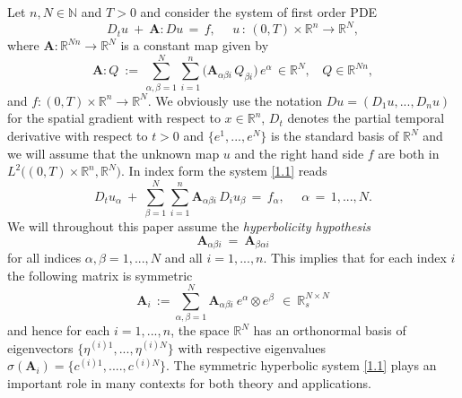 \documentclass{amsart}
\theoremstyle{definition}
\numberwithin{equation}{section}
\begin{document}
Let $n,N\in {\mathbb{N}}$ and $T>0$ and consider the system of first order PDE
\begin{equation} \label{1.1}
D_t u\ +\ {\textbf{A}} {\!:\!} D u\, =\, f,\ \ \ \ \ \ u\,:\, (0,T){\times}{\mathbb{R}}^n{\longrightarrow} {\mathbb{R}}^N,
\end{equation}
where ${\textbf{A}} : {\mathbb{R}}^{Nn}{\longrightarrow} {\mathbb{R}}^N$ is  a constant map given by
\begin{equation} \label{1.2}
 {\textbf{A}} {\!:\!} Q\ :=\, \sum_{{\alpha},{\beta}=1}^N\sum_{i=1}^n\big({\textbf{A}}_{{\alpha}{\beta} i}\,Q_{{\beta} i}\big)\, e^{\alpha} \, \in {\mathbb{R}}^N, \ \ \ \ Q\in {\mathbb{R}}^{Nn},
\end{equation}
and $f : (0,T){\times}{\mathbb{R}}^n{\longrightarrow} {\mathbb{R}}^N$. We obviously use the notation $Du=(D_1u,...,D_nu)$ for the spatial gradient with respect to $x\in {\mathbb{R}}^n$, $D_t$ denotes the partial temporal derivative with respect to $t>0$ and $\{e^1,...,e^N\}$ is the standard basis of ${\mathbb{R}}^N$ and we will assume that the unknown map $u$ and the right hand side $f$ are both in $L^2\big((0,T)\!{\times}{\mathbb{R}}^n,{\mathbb{R}}^N \big)$.  In index form the system \eqref{1.1} reads
\[
D_t u_{\alpha}\ +\ \sum_{{\beta}=1}^N\sum_{i=1}^n{\textbf{A}}_{{\alpha} {\beta} i}\, D_iu_{\beta}\, =\, f_{\alpha}, \ \ \ \ \ \ {\alpha}\,=\, 1,...,N.
\]
We will throughout this paper assume the \emph{hyperbolicity hypothesis}
\begin{equation}   \label{1.3}
{\textbf{A}}_{{\alpha} {\beta} i} \ =\ {\textbf{A}}_{{\beta} {\alpha} i}
\end{equation}
for all indices ${\alpha},{\beta}=1,...,N$ and all $i=1,...,n$. This implies that for each index $i$ the following matrix is symmetric
\begin{equation}  \label{1.3A}
{\textbf{A}}_i \, := \sum_{{\alpha},{\beta}=1}^N  {\textbf{A}}_{{\alpha}{\beta} i} \ e^{\alpha} {\otimes} e^{\beta} \ \, \in\ {\mathbb{R}}_s^{N{\times} N}
\end{equation}
and hence for each $i=1,...,n$, the space ${\mathbb{R}}^N$ has an orthonormal basis of eigenvectors $\{\eta^{(i)1},...,\eta^{(i)N}\}$ with respective eigenvalues ${\sigma}({\textbf{A}}_i)=\{c^{(i)1},....,c^{(i)N}\}$. The symmetric hyperbolic system \eqref{1.1} plays an important role in many contexts for both theory and applications.
\end{document}
